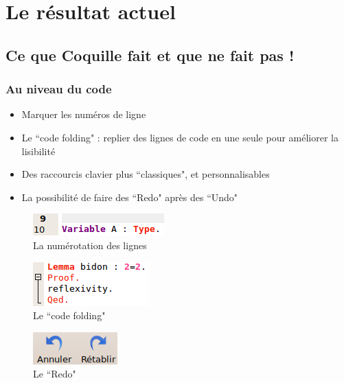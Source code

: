 \section{Le résultat actuel}

    \subsection{Ce que Coquille fait et que \coqide ne fait pas !}
    
        \subsubsection{Au niveau du code}
        
            \begin{itemize}
                \item Marquer les numéros de ligne
                \item Le ``code folding" : replier des lignes de code en une seule pour améliorer la lisibilité
                \item Des raccourcis clavier plus ``classiques", et personnalisables
                \item La possibilité de faire des ``Redo" après des ``Undo"
            \end{itemize}
            \begin{figure}[ht]
	            \centering
	            \includegraphics[scale=0.5]{ide_images/lines.png}
	            \caption{La numérotation des lignes}
            \end{figure}
            \begin{figure}[ht]
	            \centering
	            \includegraphics[scale=0.5]{ide_images/folding.png}
	            \caption{Le ``code folding"}
            \end{figure}
            \begin{figure}[ht]
	            \centering
	            \includegraphics[scale=0.5]{ide_images/redo.png}
	            \caption{Le ``Redo"}
            \end{figure}
            
